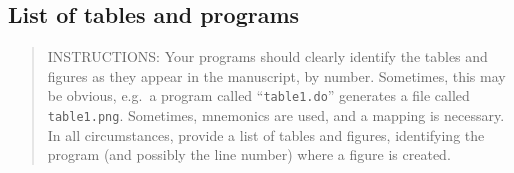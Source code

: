 \documentclass[
]{article}
\begin{document}
\hypertarget{list-of-tables-and-programs}{%
\subsection{List of tables and
programs}\label{list-of-tables-and-programs}}

\begin{quote}
INSTRUCTIONS: Your programs should clearly identify the tables and
figures as they appear in the manuscript, by number. Sometimes, this may
be obvious, e.g.~a program called ``\texttt{table1.do}'' generates a
file called \texttt{table1.png}. Sometimes, mnemonics are used, and a
mapping is necessary. In all circumstances, provide a list of tables and
figures, identifying the program (and possibly the line number) where a
figure is created.
\end{quote}
\end{document}
